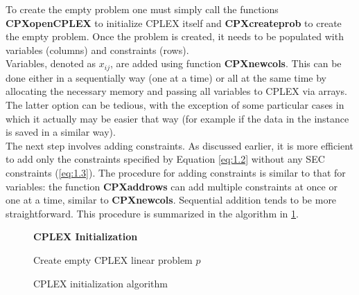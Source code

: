 To create the empty problem one must simply call the functions \textbf{CPXopenCPLEX} to initialize CPLEX itself and \textbf{CPXcreateprob} to create the empty problem.
Once the problem is created, it needs to be populated with variables (columns) and constraints (rows).\\
Variables, denoted as $x_{ij}$, are added using function \textbf{CPXnewcols}.
This can be done either in a sequentially way (one at a time) or all at the same time by allocating the necessary memory and passing all variables to CPLEX via arrays.
The latter option can be tedious, with the exception of some particular cases in which it actually may be easier that way (for example if the data in the instance is saved in a similar way).\\
The next step involves adding constraints. As discussed earlier, it is more efficient to add only the constraints specified by Equation \eqref{eq:1.2} without any SEC constraints (\eqref{eq:1.3}).
The procedure for adding constraints is similar to that for variables: the function \textbf{CPXaddrows} can add multiple constraints at once or one at a time, similar to \textbf{CPXnewcols}.
Sequential addition tends to be more straightforward.
This procedure is summarized in the algorithm in \figurename{ \ref{fig:CPLEXinit}}.

\begin{figure}[htbp]
	\textbf{CPLEX Initialization} \\
	\begin{algorithm}[H]
		\vspace{2mm}
		Create empty CPLEX linear problem $p$\\
	\end{algorithm}
	\caption{CPLEX initialization algorithm}\label{fig:CPLEXinit}
\end{figure}

